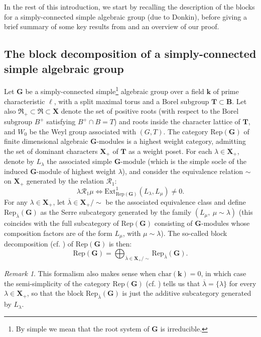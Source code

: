 \documentclass[11pt]{amsart}
\theoremstyle{plain}
\theoremstyle{remark}
\newtheorem{rem}[thm]{Remark}
\numberwithin{equation}{section}
\begin{document}
	In the rest of this introduction, we start by recalling the description of the blocks for a simply-connected simple algebraic group (due to Donkin), before giving a brief summary of some key results from \cite{riche2020smithtreumann} and an overview of our proof.
	\subsection{The block decomposition of a simply-connected simple algebraic group}
	Let $\mathbf{G}$ be a simply-connected simple\footnote{By simple we mean that the root system of $\mathbf{G}$ is irreducible.} algebraic group over a field $\mathbf{k}$ of prime characteristic $\ell$, with a split maximal torus and a Borel subgroup $\mathbf{T}\subset \mathbf{B}$. Let also $\mathfrak{R}_+\subset\mathfrak{R}\subset\mathbf{X}$ denote the set of positive roots (with respect to the Borel subgroup $B^+$ satisfying $B^+\cap B=T$) and roots inside the character lattice of $\mathbf{T}$, and $W_0$ be the Weyl group associated with $(G,T)$. The category $\mathrm{Rep}(\mathbf{G})$ of finite dimensional algebraic $\mathbf{G}$-modules is a highest weight category, admitting the set of dominant characters $\mathbf{X}_+$ of $\mathbf{T}$ as a weight poset. For each $\lambda\in\mathbf{X}_+$, denote by $L_\lambda$ the associated simple $\mathbf{G}$-module (which is the simple socle of the induced $\mathbf{G}$-module of highest weight $\lambda$), and consider the equivalence relation $\sim$ on $\mathbf{X}_+$ generated by the relation $\mathscr{R}_1$:
	$$\lambda\mathscr{R}_1\mu\Longleftrightarrow \mathrm{Ext}_{\mathrm{Rep}(\mathbf{G})}^1(L_\lambda,L_\mu)\neq 0. $$
	For any $\lambda\in\mathbf{X}_+$, let $\overline{\lambda}\in \mathbf{X}_+/\sim$ be the associated equivalence class and define $\mathrm{Rep}_{\overline{\lambda}}(\mathbf{G})$ as the Serre subcategory generated by the family $(L_\mu,~\mu\sim\lambda)$ (this coincides with the full subcategory of $\mathrm{Rep}(\mathbf{G})$ consisting of $\mathbf{G}$-modules whose composition factors are of the form $L_\mu$, with $\mu\sim\lambda$). The so-called block decomposition (cf. \cite[Lemma 7.1, Part II]{jantzen2003representations}) of $\mathrm{Rep}(\mathbf{G})$ is then: 
	$$\mathrm{Rep}(\mathbf{G})= \bigoplus_{\overline{\lambda}\in \mathbf{X}_+/\sim}\mathrm{Rep}_{\overline{\lambda}}(\mathbf{G}).$$
	\begin{rem}
	    This formalism also makes sense when $\mathrm{char}(\mathbf{k})=0$, in which case the semi-simplicity of the category $\mathrm{Rep}(\mathbf{G})$ (cf. \cite[Theorem 22.42]{milne2017algebraic}) tells us that $\overline{\lambda}=\{\lambda\}$ for every $\lambda\in\mathbf{X}_+$, so that the block $\mathrm{Rep}_{\overline{\lambda}}(\mathbf{G})$ is just the additive subcategory generated by $L_\lambda$.
	\end{rem}  
\end{document}
